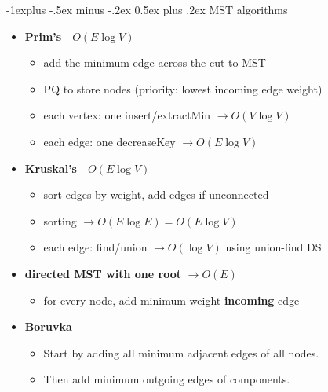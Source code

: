 \documentclass[10pt, landscape]{article}
\makeatletter
\renewcommand{\subsection}{\@startsection{subsection}{2}{0mm}%
                                {-1explus -.5ex minus -.2ex}%
                                {0.5ex plus .2ex}%
                                {\normalfont\normalsize\bfseries}}
\let\then\rightarrow
\makeatother
\begin{document}
\begin{multicols}{4}
\subsection{MST algorithms}
\begin{itemize}
    \item \textbf{Prim's} - $O(E \log V)$
    \begin{itemize}
        \item add the minimum edge across the cut to MST
        \item PQ to store nodes (priority: lowest incoming edge weight)
        \item each vertex: one insert/extractMin $\then O(V \log V)$
        \item each edge: one decreaseKey $\then O(E \log V)$
    \end{itemize}
    \item \textbf{Kruskal's} - $O(E \log V)$
    \begin{itemize}
        \item sort edges by weight, add edges if unconnected
        \item sorting $\then O(E \log E) = O(E \log V)$
        \item each edge: find/union $\then O(\log V)$ using union-find DS
    \end{itemize}
    \item \textbf{directed MST with one root} $\then O(E)$
    \begin{itemize}
        \item for every node, add minimum weight \textbf{incoming} edge
    \end{itemize}
    \item \textbf{Boruvka}
    \begin{itemize}
        \item Start by adding all minimum adjacent edges of all nodes.
        \item Then add minimum outgoing edges of components.
    \end{itemize}
\end{itemize}


\end{multicols}
\end{document}
